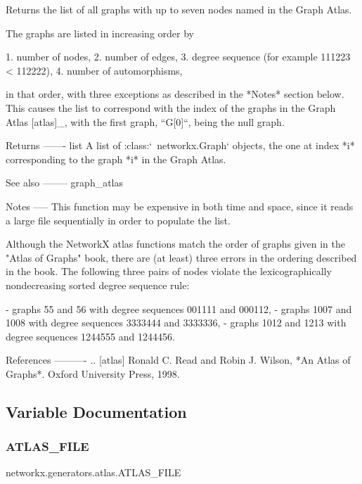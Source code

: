 \begin{DoxyVerb}Returns the list of all graphs with up to seven nodes named in the
Graph Atlas.

The graphs are listed in increasing order by

1. number of nodes,
2. number of edges,
3. degree sequence (for example 111223 < 112222),
4. number of automorphisms,

in that order, with three exceptions as described in the *Notes*
section below. This causes the list to correspond with the index of
the graphs in the Graph Atlas [atlas]_, with the first graph,
``G[0]``, being the null graph.

Returns
-------
list
    A list of :class:`~networkx.Graph` objects, the one at index *i*
    corresponding to the graph *i* in the Graph Atlas.

See also
--------
graph_atlas

Notes
-----
This function may be expensive in both time and space, since it
reads a large file sequentially in order to populate the list.

Although the NetworkX atlas functions match the order of graphs
given in the "Atlas of Graphs" book, there are (at least) three
errors in the ordering described in the book. The following three
pairs of nodes violate the lexicographically nondecreasing sorted
degree sequence rule:

- graphs 55 and 56 with degree sequences 001111 and 000112,
- graphs 1007 and 1008 with degree sequences 3333444 and 3333336,
- graphs 1012 and 1213 with degree sequences 1244555 and 1244456.

References
----------
.. [atlas] Ronald C. Read and Robin J. Wilson,
           *An Atlas of Graphs*.
           Oxford University Press, 1998.\end{DoxyVerb}
 

\subsection{Variable Documentation}
\mbox{\label{namespacenetworkx_1_1generators_1_1atlas_abd103c982d8d5c367b08a9a331724590}} 
\subsubsection{\texorpdfstring{A\+T\+L\+A\+S\+\_\+\+F\+I\+LE}{ATLAS\_FILE}}
{\footnotesize\ttfamily networkx.\+generators.\+atlas.\+A\+T\+L\+A\+S\+\_\+\+F\+I\+LE}

